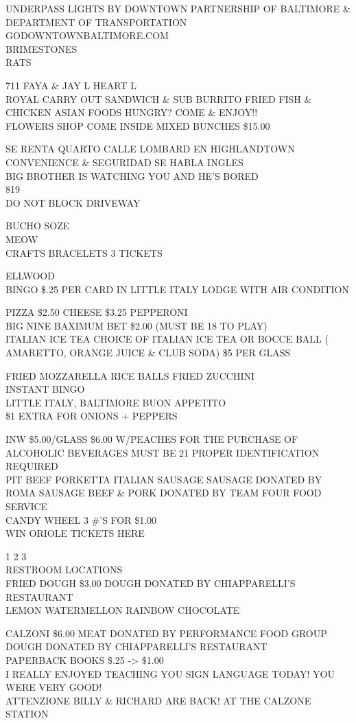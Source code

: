 \documentclass[10pt,letterpaper]{article}
\begin{document}
UNDERPASS LIGHTS BY DOWNTOWN PARTNERSHIP OF BALTIMORE \& DEPARTMENT OF TRANSPORTATION GODOWNTOWNBALTIMORE.COM\\
BRIMESTONES\\
RATS

711 FAYA \& JAY L HEART L\\
ROYAL CARRY OUT SANDWICH \& SUB BURRITO FRIED FISH \& CHICKEN ASIAN FOODS HUNGRY?  COME \& ENJOY!!\\
FLOWERS SHOP COME INSIDE MIXED BUNCHES \$15.00

SE RENTA QUARTO CALLE LOMBARD EN HIGHLANDTOWN CONVENIENCE \& SEGURIDAD SE HABLA INGLES\\
BIG BROTHER IS WATCHING YOU AND HE'S BORED\\
819\\
DO NOT BLOCK DRIVEWAY

BUCHO SOZE\\
MEOW\\
CRAFTS BRACELETS 3 TICKETS

ELLWOOD\\
BINGO \$.25 PER CARD IN LITTLE ITALY LODGE WITH AIR CONDITION

PIZZA \$2.50 CHEESE \$3.25 PEPPERONI\\
BIG NINE BAXIMUM BET \$2.00 (MUST BE 18 TO PLAY)\\
ITALIAN ICE TEA CHOICE OF ITALIAN ICE TEA OR BOCCE BALL ( AMARETTO, ORANGE JUICE \& CLUB SODA) \$5 PER GLASS

FRIED MOZZARELLA RICE BALLS FRIED ZUCCHINI\\
INSTANT BINGO\\
LITTLE ITALY, BALTIMORE BUON APPETITO\\
\$1 EXTRA FOR ONIONS + PEPPERS

INW \$5.00/GLASS \$6.00 W/PEACHES FOR THE PURCHASE OF ALCOHOLIC BEVERAGES MUST BE 21 PROPER IDENTIFICATION REQUIRED\\
PIT BEEF PORKETTA ITALIAN SAUSAGE SAUSAGE DONATED BY ROMA SAUSAGE BEEF \& PORK DONATED BY TEAM FOUR FOOD SERVICE\\
CANDY WHEEL 3 \#'S FOR \$1.00\\
WIN ORIOLE TICKETS HERE

1 2 3\\
RESTROOM LOCATIONS\\
FRIED DOUGH \$3.00 DOUGH DONATED BY CHIAPPARELLI'S RESTAURANT\\
LEMON WATERMELLON RAINBOW CHOCOLATE

CALZONI \$6.00 MEAT DONATED BY PERFORMANCE FOOD GROUP DOUGH DONATED BY CHIAPPARELLI'S RESTAURANT\\
PAPERBACK BOOKS \$.25 {-}> \$1.00\\
I REALLY ENJOYED TEACHING YOU SIGN LANGUAGE TODAY!  YOU WERE VERY GOOD!\\
ATTENZIONE BILLY \& RICHARD ARE BACK! AT THE CALZONE STATION
\end{document}

